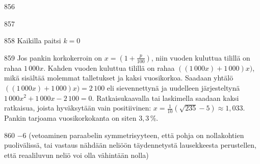 \begin{Vastaus}{856}
	
\end{Vastaus}
\begin{Vastaus}{857}
		
\end{Vastaus}
\begin{Vastaus}{858}
Kaikilla paitsi $k=0$
	
\end{Vastaus}
\begin{Vastaus}{859}
	Jos pankin korkokerroin on $x=(1+\frac{p}{100})$, niin vuoden kuluttua tilillä on rahaa $1\,000x$. Kahden vuoden kuluttua tilillä on rahaa $((1\,000x)+1\,000)x)$, mikä sisältää molemmat talletukset ja kaksi vuosikorkoa. Saadaan yhtälö $((1\,000x)+1\,000)x)=2\,100$ eli sievennettynä ja uudelleen järjesteltynä $1\,000x^2+1\,000x-2\,100=0$. Ratkaisukaavalla tai laskimella saadaan kaksi ratkaisua, joista hyväksytään vain positiivinen: $x=\frac{1}{10}(\sqrt{235}-5)\approx1,033$. Pankin tarjoama vuosikorkokanta on siten $3,3$\,\%.
	
\end{Vastaus}
\begin{Vastaus}{860}
	$-6$ (vetoaminen paraabelin symmetrisyyteen, että pohja on nollakohtien puolivälissä, tai vastaus nähdään neliöön täydennetystä lausekkeesta perustellen, että reaaliluvun neliö voi olla vähintään nolla)
	
\end{Vastaus}
